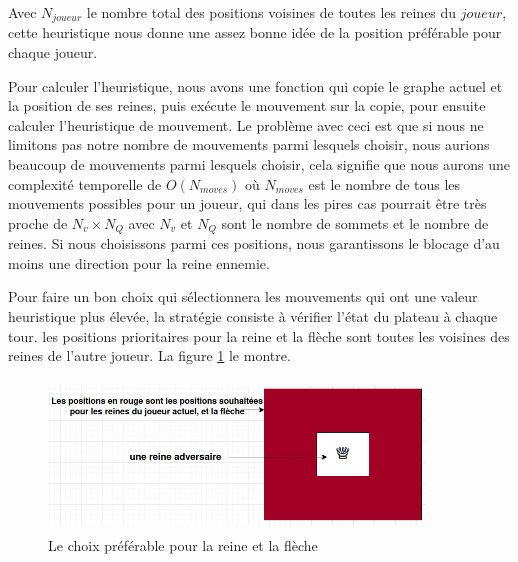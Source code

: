 \documentclass[11pt]{article}
\begin{document}
        Avec $N_{joueur}$ le nombre total des positions voisines de toutes les reines du $joueur$, cette heuristique nous donne une assez bonne idée de la position préférable pour chaque joueur.
        
        Pour calculer l'heuristique, nous avons une fonction qui copie le graphe actuel et la position de ses reines, puis exécute le mouvement sur la copie, pour ensuite calculer l'heuristique de mouvement.
        Le problème avec ceci est que si nous ne limitons pas notre nombre de mouvements parmi lesquels choisir, nous aurions beaucoup de mouvements parmi lesquels choisir, cela signifie que nous aurons une complexité temporelle de $O(N_{moves})$ où $N_{moves}$ est le nombre de tous les mouvements possibles pour un joueur, qui dans les pires cas pourrait être très proche de $N_{v} \times N_{Q}$ avec $N_{v}$ et $N_{Q}$ sont le nombre de sommets et le nombre de reines. Si nous choisissons parmi ces positions, nous garantissons le blocage d'au moins une direction pour la reine ennemie. 
 
        Pour faire un bon choix qui sélectionnera les mouvements qui ont une valeur heuristique plus élevée, la stratégie consiste à vérifier l'état du plateau à chaque tour. les positions prioritaires pour la reine et la flèche sont toutes les voisines des reines de l'autre joueur. La figure  \ref{fig:neighbors} le montre.
                 \begin{figure}[h]
                \centering
                \includegraphics[width = 10cm, height = 4cm]{queen_neighbors.jpeg}
                \caption{Le choix préférable pour la reine et la flèche }
                \label{fig:neighbors}
            \end{figure}
  
\end{document}

